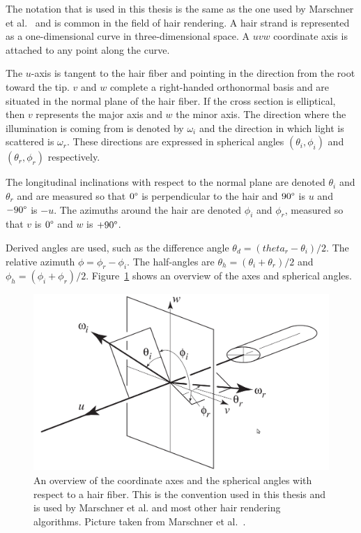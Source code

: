 \documentclass[11pt,a4paper]{report}
\begin{document}
The notation that is used in this thesis is the same as the one used by Marschner et al.~\cite{marschner} and is common in the field of hair rendering. A hair strand is represented as a one-dimensional curve in three-dimensional space. A $uvw$ coordinate axis is attached to any point along the curve.

The $u$-axis is tangent to the hair fiber and pointing in the direction from the root toward the tip. $v$ and $w$ complete a right-handed orthonormal basis and are situated in the normal plane of the hair fiber. If the cross section is elliptical, then  $v$ represents the major axis and $w$ the minor axis. The direction where the illumination is coming from is denoted by $\omega_i$ and the direction in which light is scattered is $\omega_r$. These directions are expressed in spherical angles $(\theta_i, \phi_i)$ and $(\theta_r,\phi_r)$ respectively.

The longitudinal inclinations with respect to the normal plane are denoted $\theta_i$ and $\theta_r$ and are measured so that $0\degree$ is perpendicular to the hair and $90\degree$ is $u$ and $-90\degree$ is $-u$. The azimuths around the hair are denoted $\phi_i$ and $\phi_r$, measured so that $v$ is $0\degree$ and $w$ is $+90\degree$.

Derived angles are used, such as the difference angle $\theta_d = (theta_r - \theta_i)/2$. The relative azimuth $\phi = \phi_r - \phi_i$. The half-angles are $\theta_h = (\theta_i + \theta_r)/2$ and $\phi_h = (\phi_i + \phi_r)/2$. Figure~\ref{axis_overview} shows an overview of the axes and spherical angles.

\begin{center}
\begin{figure}

\includegraphics[scale=.4]{images/axes.jpeg}

\caption{An overview of the coordinate axes and the spherical angles with respect to a hair fiber. This is the convention used in this thesis and is used by Marschner et al. and most other hair rendering algorithms. Picture taken from Marschner et al.~\cite{marschner}.}
\label{axis_overview}

\end{figure}
\end{center}
\end{document}
